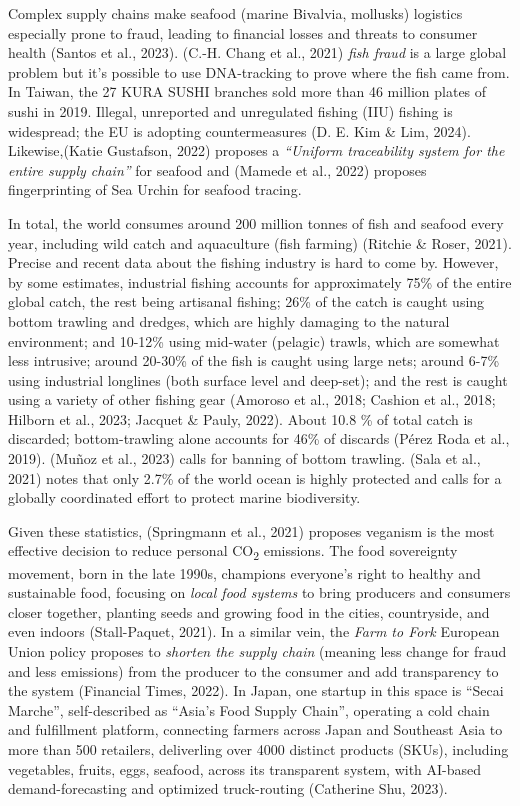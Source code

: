\documentclass[
  12pt,
  letterpaper,
  DIV=11,
  numbers=noendperiod]{scrartcl}
\begin{document}
Complex supply chains make seafood (marine Bivalvia, mollusks) logistics
especially prone to fraud, leading to financial losses and threats to
consumer health (Santos et al., 2023). (C.-H. Chang et al., 2021)
\emph{fish fraud} is a large global problem but it's possible to use
DNA-tracking to prove where the fish came from. In Taiwan, the 27 KURA
SUSHI branches sold more than 46 million plates of sushi in 2019.
Illegal, unreported and unregulated fishing (IIU) fishing is widespread;
the EU is adopting countermeasures (D. E. Kim \& Lim, 2024).
Likewise,(Katie Gustafson, 2022) proposes a \emph{``Uniform traceability
system for the entire supply chain''} for seafood and (Mamede et al.,
2022) proposes fingerprinting of Sea Urchin for seafood tracing.

In total, the world consumes around 200 million tonnes of fish and
seafood every year, including wild catch and aquaculture (fish farming)
(Ritchie \& Roser, 2021). Precise and recent data about the fishing
industry is hard to come by. However, by some estimates, industrial
fishing accounts for approximately 75\% of the entire global catch, the
rest being artisanal fishing; 26\% of the catch is caught using bottom
trawling and dredges, which are highly damaging to the natural
environment; and 10-12\% using mid-water (pelagic) trawls, which are
somewhat less intrusive; around 20-30\% of the fish is caught using
large nets; around 6-7\% using industrial longlines (both surface level
and deep-set); and the rest is caught using a variety of other fishing
gear (Amoroso et al., 2018; Cashion et al., 2018; Hilborn et al., 2023;
Jacquet \& Pauly, 2022). About 10.8 \% of total catch is discarded;
bottom-trawling alone accounts for 46\% of discards (Pérez Roda et al.,
2019). (Muñoz et al., 2023) calls for banning of bottom trawling. (Sala
et al., 2021) notes that only 2.7\% of the world ocean is highly
protected and calls for a globally coordinated effort to protect marine
biodiversity.

Given these statistics, (Springmann et al., 2021) proposes veganism is
the most effective decision to reduce personal CO\textsubscript{2}
emissions. The food sovereignty movement, born in the late 1990s,
champions everyone's right to healthy and sustainable food, focusing on
\emph{local food systems} to bring producers and consumers closer
together, planting seeds and growing food in the cities, countryside,
and even indoors (Stall-Paquet, 2021). In a similar vein, the \emph{Farm
to Fork} European Union policy proposes to \emph{shorten the supply
chain} (meaning less change for fraud and less emissions) from the
producer to the consumer and add transparency to the system (Financial
Times, 2022). In Japan, one startup in this space is ``Secai Marche'',
self-described as ``Asia's Food Supply Chain'', operating a cold chain
and fulfillment platform, connecting farmers across Japan and Southeast
Asia to more than 500 retailers, deliverling over 4000 distinct products
(SKUs), including vegetables, fruits, eggs, seafood, across its
transparent system, with AI-based demand-forecasting and optimized
truck-routing (Catherine Shu, 2023).
\end{document}
